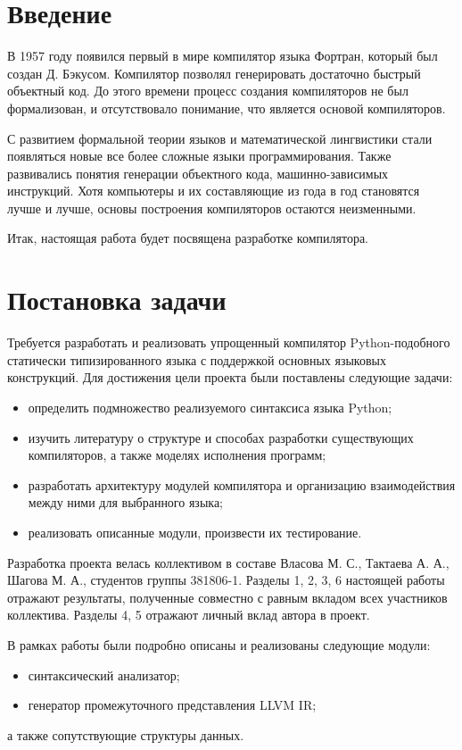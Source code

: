 \newpage
\section*{Введение}

В 1957 году появился первый в мире компилятор языка Фортран, который был создан Д. Бэкусом. Компилятор позволял генерировать достаточно быстрый объектный код. До этого времени процесс создания компиляторов не был формализован, и отсутствовало понимание, что является основой компиляторов.

С развитием формальной теории языков и математической лингвистики стали появляться новые все более сложные языки программирования. Также развивались понятия генерации объектного кода, машинно-зависимых инструкций. Хотя компьютеры и их составляющие из года в год становятся лучше и лучше, основы построения компиляторов остаются неизменными.

Итак, настоящая работа будет посвящена разработке компилятора.

\newpage
\section*{Постановка задачи}

Требуется разработать и реализовать упрощенный компилятор Python-подобного статически типизированного языка с поддержкой основных языковых конструкций.  Для достижения цели проекта были поставлены следующие задачи:

\begin{itemize}
    \item определить подмножество реализуемого синтаксиса языка Python;
    \item изучить литературу о структуре и способах разработки существующих компиляторов, а также моделях исполнения программ;
    \item разработать архитектуру модулей компилятора и организацию взаимодействия между ними для выбранного языка;
    \item реализовать описанные модули, произвести их тестирование.
\end{itemize}

Разработка проекта велась коллективом в составе Власова М. С., Тактаева А. А., Шагова М. А., студентов группы 381806-1. Разделы 1, 2, 3, 6 настоящей работы отражают результаты, полученные совместно с равным вкладом всех участников коллектива. Разделы 4, 5 отражают личный вклад автора в проект.

В рамках работы были подробно описаны и реализованы следующие модули:

\begin{itemize}
    \item синтаксический анализатор;
    \item генератор промежуточного представления LLVM IR;
\end{itemize}

а также сопутствующие структуры данных.
